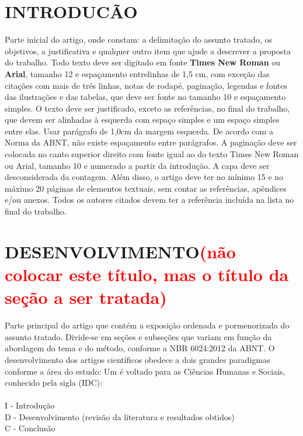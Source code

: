 \documentclass[12pt]{article}
\begin{document}
\vspace{1cm}
\onehalfspacing

\section{INTRODUCÃO} 
\label{introdução}

Parte inicial do artigo, onde constam: a delimitação do assunto tratado, os objetivos, a justificativa e qualquer outro item que ajude a descrever a proposta do trabalho. 
Todo texto deve ser digitado em fonte \textbf{Times New Roman} ou \textbf{Arial}, tamanho 12 e espaçamento entrelinhas de 1,5 cm, com exceção das citações com mais de três linhas, notas de rodapé, paginação, legendas e fontes das ilustrações e das tabelas, que deve ser fonte no tamanho 10 e espaçamento simples. 
O texto deve ser justificado, exceto as referências, no final do trabalho, que devem ser alinhadas à esquerda com espaço simples e um espaço simples entre elas. 
Usar parágrafo de 1,0cm da margem esquerda. De acordo com a Norma da ABNT, não existe espaçamento entre parágrafos.
A paginação deve ser colocada no canto superior direito com fonte igual ao do texto Times New Roman ou Arial, tamanho 10 e numerado a partir da introdução. A capa deve ser desconsiderada da contagem. Além disso, o artigo deve ter no mínimo 15 e no máximo 20 páginas de elementos textuais, sem contar as referências, apêndices e/ou anexos.
Todos os autores citados devem ter a referência incluída na lista no final do trabalho.


\section{DESENVOLVIMENTO\textcolor{red}{(não colocar este título, mas o título da seção a ser tratada)}} \label{desenvolvimento}

Parte principal do artigo que contém a exposição ordenada e pormenorizada do assunto tratado. Divide-se em seções e subseções que variam em função da abordagem do tema e do método, conforme a NBR 6024:2012 da ABNT. O desenvolvimento dos artigos científicos obedece a dois grandes paradigmas conforme a área do estudo:
Um é voltado para as Ciências Humanas e Sociais, conhecido pela sigla (IDC): \\
\\I
- Introdução
\\D
- Desenvolvimento (revisão da literatura e resultados obtidos)
\\C
- Conclusão
\end{document}
